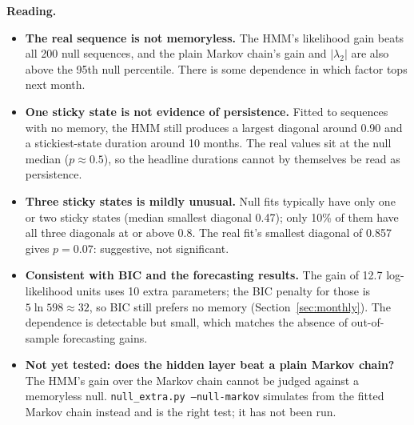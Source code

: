 \documentclass[11pt]{article}
\begin{document}
\textbf{Reading.}
\begin{itemize}
\item \textbf{The real sequence is not memoryless.} The HMM's likelihood gain beats all 200 null sequences, and the plain Markov chain's gain and $|\lambda_2|$ are also above the 95th null percentile. There is some dependence in which factor tops next month.
\item \textbf{One sticky state is not evidence of persistence.} Fitted to sequences with no memory, the HMM still produces a largest diagonal around 0.90 and a stickiest-state duration around 10 months. The real values sit at the null median ($p\approx0.5$), so the headline durations cannot by themselves be read as persistence.
\item \textbf{Three sticky states is mildly unusual.} Null fits typically have only one or two sticky states (median smallest diagonal 0.47); only 10\% of them have all three diagonals at or above 0.8. The real fit's smallest diagonal of 0.857 gives $p=0.07$: suggestive, not significant.
\item \textbf{Consistent with BIC and the forecasting results.} The gain of 12.7 log-likelihood units uses 10 extra parameters; the BIC penalty for those is $5\ln 598\approx 32$, so BIC still prefers no memory (Section~\ref{sec:monthly}). The dependence is detectable but small, which matches the absence of out-of-sample forecasting gains.
\item \textbf{Not yet tested: does the hidden layer beat a plain Markov chain?} The HMM's gain over the Markov chain cannot be judged against a memoryless null. \texttt{null\_extra.py --null-markov} simulates from the fitted Markov chain instead and is the right test; it has not been run.
\end{itemize}
\end{document}
